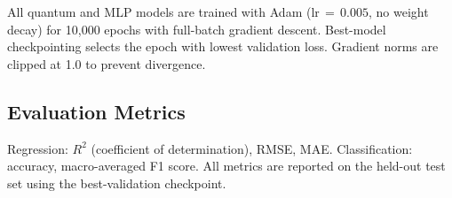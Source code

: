 All quantum and MLP models are trained with Adam (lr$\,{=}\,0.005$, no
weight decay) for 10{,}000 epochs with full-batch gradient descent.
Best-model checkpointing selects the epoch with lowest validation loss.
Gradient norms are clipped at 1.0 to prevent divergence.

\subsection{Evaluation Metrics}

Regression: $R^2$ (coefficient of determination), RMSE, MAE.
Classification: accuracy, macro-averaged F1 score.
All metrics are reported on the held-out test set using the best-validation
checkpoint.
